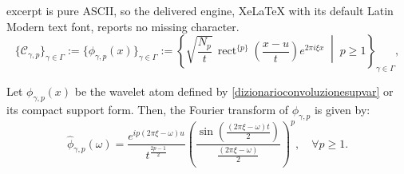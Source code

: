 \documentclass[10pt,a4paper]{amsart}
\begin{document}
excerpt is pure ASCII, so the delivered engine, XeLaTeX with its default Latin Modern text font, reports no missing character.
\begin{equation}
\{\mathcal{C}_{\gamma,p}\}_{\gamma \in \Gamma} := \{\phi_{\gamma,p}(x)\}_{\gamma \in \Gamma} := \left\{ \sqrt{\frac{N_p}{t}} \, \operatorname{rect}^{\{p\}}\left( \frac{x - u}{t} \right) e^{2\pi i \xi x} \;\middle|\; p \ge 1 \right\}_{\gamma \in \Gamma},
\label{dizionarioconvoluzionesupvar}
\end{equation}

\begin{Lemma}
    Let $ \phi_{\gamma,p}(x) $ be the wavelet atom defined by \eqref{dizionarioconvoluzionesupvar} or its compact support form. Then, the Fourier transform of $ \phi_{\gamma,p} $ is given by:
$$
\hat{\phi}_{\gamma,p}(\omega) = \frac{e^{i p (2\pi \xi - \omega) u}}{t^{\frac{2p - 1}{2}}} \left( \frac{\sin\left( \frac{(2\pi \xi - \omega) t}{2} \right)}{ \frac{(2\pi \xi - \omega)}{2} } \right)^p, \quad \forall p \ge 1.
$$

\end{Lemma}
\end{document}
